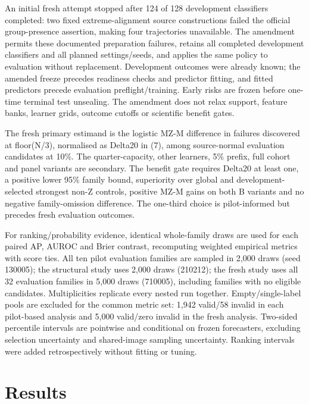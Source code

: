 An initial fresh attempt stopped after 124 of 128 development classifiers completed: two fixed extreme-alignment source constructions failed the official group-presence assertion, making four trajectories unavailable. The amendment permits these documented preparation failures, retains all completed development classifiers and all planned settings/seeds, and applies the same policy to evaluation without replacement. Development outcomes were already known; the amended freeze precedes readiness checks and predictor fitting, and fitted predictors precede evaluation preflight/training. Early risks are frozen before one-time terminal test unsealing. The amendment does not relax support, feature banks, learner grids, outcome cutoffs or scientific benefit gates.

The fresh primary estimand is the logistic MZ-M difference in failures discovered at floor(N/3), normalised as Delta20 in (7), among source-normal evaluation candidates at 10\%. The quarter-capacity, other learners, 5\% prefix, full cohort and panel variants are secondary. The benefit gate requires Delta20 at least one, a positive lower 95\% family bound, superiority over global and development-selected strongest non-Z controls, positive MZ-M gains on both B variants and no negative family-omission difference. The one-third choice is pilot-informed but precedes fresh evaluation outcomes.

For ranking/probability evidence, identical whole-family draws are used for each paired AP, AUROC and Brier contrast, recomputing weighted empirical metrics with score ties. All ten pilot evaluation families are sampled in 2,000 draws (seed 130005); the structural study uses 2,000 draws (210212); the fresh study uses all 32 evaluation families in 5,000 draws (710005), including families with no eligible candidates. Multiplicities replicate every nested run together. Empty/single-label pools are excluded for the common metric set: 1,942 valid/58 invalid in each pilot-based analysis and 5,000 valid/zero invalid in the fresh analysis. Two-sided percentile intervals are pointwise and conditional on frozen forecasters, excluding selection uncertainty and shared-image sampling uncertainty. Ranking intervals were added retrospectively without fitting or tuning.

\section{Results}
\label{sec:results}
